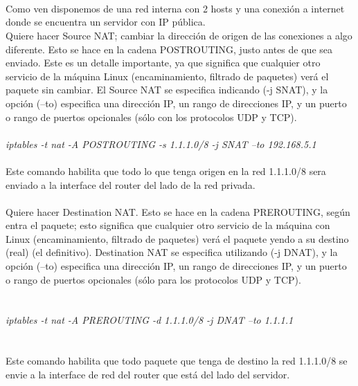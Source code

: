 \documentclass{article}
\begin{document}
\\\\ \hfill \\
Como ven disponemos de una red interna con 2 hosts y una conexión a internet donde se encuentra un servidor con IP pública.\\
Quiere hacer Source NAT; cambiar la dirección de origen de las conexiones a algo diferente. Esto se hace en la cadena POSTROUTING, justo antes de que sea enviado. Este es un detalle importante, ya que significa que cualquier otro servicio de la máquina Linux (encaminamiento, filtrado de paquetes) verá el paquete sin cambiar.
El Source NAT se especifica indicando (-j SNAT), y la opción (--to) especifica una dirección IP, un rango de direcciones IP, y un puerto o rango de puertos opcionales (sólo con los protocolos UDP y TCP).\\
\hfill\\
\textit{iptables -t nat -A POSTROUTING -s 1.1.1.0/8 -j SNAT --to 192.168.5.1}
\\ \hfill \\
Este comando habilita que todo lo que tenga origen en la red 1.1.1.0/8 sera enviado a la interface del router del lado de la red privada.
\\ \hfill \\
Quiere hacer Destination NAT. Esto se hace en la cadena PREROUTING, según entra el paquete; esto significa que cualquier otro servicio de la máquina con Linux (encaminamiento, filtrado de paquetes) verá el paquete yendo a su destino (real) (el definitivo).
Destination NAT se especifica utilizando (-j DNAT), y la opción (--to) especifica una dirección IP, un rango de direcciones IP, y un puerto o rango de puertos opcionales (sólo para los protocolos UDP y TCP).\\\\ \hfill \\
\textit{iptables -t nat -A PREROUTING -d 1.1.1.0/8 -j DNAT --to 1.1.1.1}
\\\\ \hfill \\
Este comando habilita que todo paquete que tenga de destino la red 1.1.1.0/8 se envie a la interface de red del router que está del lado del servidor. 
\end{document}
